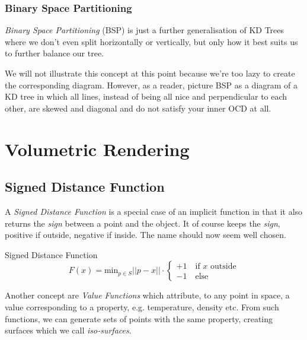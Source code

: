 \documentclass{panikzettel}
\begin{document}
\subsubsection*{Binary Space Partitioning}

\textit{Binary Space Partitioning} (BSP) is just a further generalisation of KD Trees where we don't even split horizontally or vertically, but only how it best suits us to further balance our tree.

We will not illustrate this concept at this point because we're too lazy to create the corresponding diagram. However, as a reader, picture BSP as a diagram of a KD tree in which all lines, instead of being all nice and perpendicular to each other, are skewed and diagonal and do not satisfy your inner OCD at all.

\section{Volumetric Rendering}

\subsection{Signed Distance Function}

\begin{halfboxl}
A \emph{Signed Distance Function} is a special case of an implicit function in that it also returns the \emph{sign} between a point and the object. It of course keeps the \emph{sign}, positive if outside, negative if inside. The name should now seem well chosen.
\end{halfboxl}%
\begin{halfboxr}
\vspace{-\baselineskip}
\begin{defi}{Signed Distance Function}
\[F(x) = \text{min}_{p \in S} ||p - x|| \cdot \begin{cases} +1 \quad \text{if } x \text{ outside} \\ -1 \quad \text{else} \end{cases}\]
\end{defi}
\end{halfboxr}

Another concept are \emph{Value Functions} which attribute, to any point in space, a value corresponding to a property, e.g. temperature, density etc. From such functions, we can generate sets of points with the same property, creating surfaces which we call \emph{iso-surfaces}.
\end{document}
